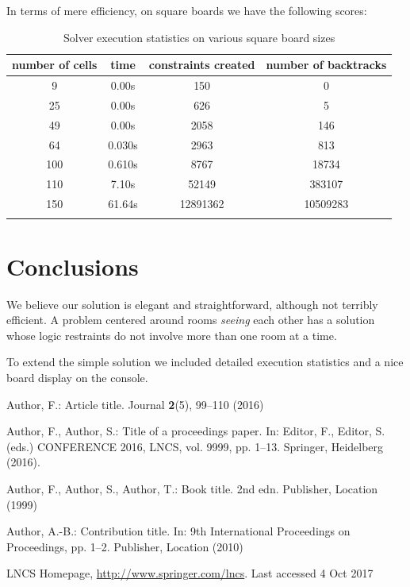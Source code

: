 \documentclass[runningheads]{llncs}
\begin{document}
In terms of mere efficiency, on square boards we have the following scores:

\begin{table}[hbtp]
\centering
\begin{tabular}{cccc}
\toprule
number of cells & time   & constraints created & number of backtracks \\
\midrule
9               & 0.00s  & 150                 & 0                    \\
25              & 0.00s  & 626                 & 5                    \\
49              & 0.00s  & 2058                & 146                  \\
64              & 0.030s & 2963                & 813                  \\
100             & 0.610s & 8767                & 18734                \\
110             & 7.10s  & 52149               & 383107               \\
150             & 61.64s & 12891362            & 10509283             \\
\bottomrule\\
\end{tabular}
\caption{Solver execution statistics on various square board sizes}
\label{tab:time}
\end{table}

\section{Conclusions}
\label{sec:conclusions}

We believe our solution is elegant and straightforward, although not terribly efficient. A problem centered around rooms \textsl{seeing} each other has a solution whose logic restraints do not involve more than one room at a time.

To extend the simple solution we included detailed execution statistics and a nice board display on the console.

%
%
%
% 
% 
%
\begin{thebibliography}{8}
	Author, F.: Article title. Journal \textbf{2}(5), 99--110 (2016)
	
	Author, F., Author, S.: Title of a proceedings paper. In: Editor,
	F., Editor, S. (eds.) CONFERENCE 2016, LNCS, vol. 9999, pp. 1--13.
	Springer, Heidelberg (2016). 
	
	Author, F., Author, S., Author, T.: Book title. 2nd edn. Publisher,
	Location (1999)
	
	Author, A.-B.: Contribution title. In: 9th International Proceedings
	on Proceedings, pp. 1--2. Publisher, Location (2010)
	
	LNCS Homepage, \url{http://www.springer.com/lncs}. Last accessed 4
	Oct 2017
\end{thebibliography}
\end{document}
